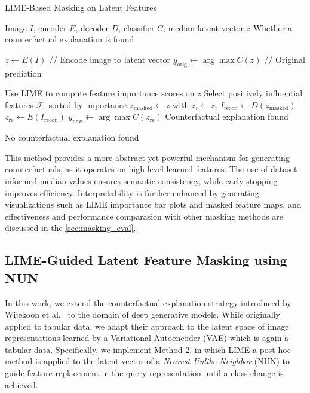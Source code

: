 \vspace{1em}
\begin{algorithm}[H]
\caption{LIME-Based Masking on Latent Features}
\label{alg:lime_on_latent}
\begin{algorithmic}[1]
\REQUIRE Image $I$, encoder $E$, decoder $D$, classifier $C$, median latent vector $\bar{z}$
\ENSURE Whether a counterfactual explanation is found

\STATE $z \leftarrow E(I)$ \hfill // Encode image to latent vector
\STATE $y_{\text{orig}} \leftarrow \arg\max C(z)$ \hfill // Original prediction

\STATE Use LIME to compute feature importance scores on $z$
\STATE Select positively influential features $\mathcal{F}$, sorted by importance
    \STATE $z_{\text{masked}} \leftarrow z$ with $z_i \leftarrow \bar{z}_i$
    \STATE $I_{\text{recon}} \leftarrow D(z_{\text{masked}})$
    \STATE $z_{\text{re}} \leftarrow E(I_{\text{recon}})$
    \STATE $y_{\text{new}} \leftarrow \arg\max C(z_{\text{re}})$
        \RETURN Counterfactual explanation found
    \ENDIF
\ENDFOR

\RETURN No counterfactual explanation found
\end{algorithmic}
\end{algorithm}
\vspace{1em}

This method provides a more abstract yet powerful mechanism for generating counterfactuals, as it operates on high-level learned features. The use of dataset-informed median values ensures semantic consistency, while early stopping improves efficiency. Interpretability is further enhanced by generating visualizations such as LIME importance bar plots and masked feature maps, and effectiveness and performance comparasion with other masking methods are discussed in the \cref{sec:masking_eval}.





\subsection{LIME-Guided Latent Feature Masking using NUN} \label{lime_with_NUN}

In this work, we extend the counterfactual explanation strategy introduced by Wijekoon et al.~\cite{WijekoonWNMPC21} to the domain of deep generative models. While originally applied to tabular data, we adapt their approach to the latent space of image representations learned by a Variational Autoencoder (VAE) which is again a tabular data. Specifically, we implement Method 2, in which LIME a post-hoc method is applied to the latent vector of a \textit{Nearest Unlike Neighbor} (NUN) to guide feature replacement in the query representation until a class change is achieved.


